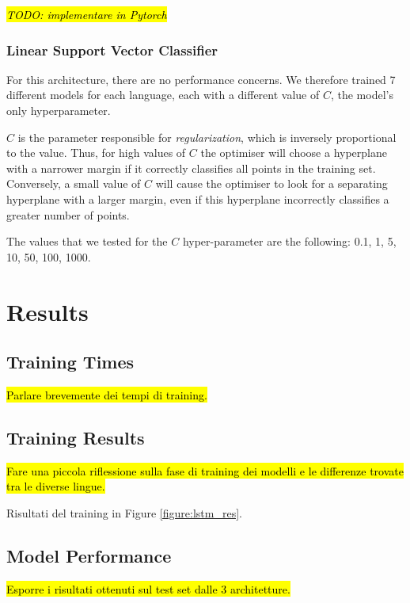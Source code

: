 \documentclass[letterpaper,11pt]{article}
\begin{document}
\hl{\textit{TODO: implementare in Pytorch}}

\subsubsection*{Linear Support Vector Classifier}

For this architecture, there are no performance concerns. We therefore trained 7 different models for each language, each with a different value of $C$, the model's only hyperparameter.

$C$ is the parameter responsible for \textit{regularization}, which is inversely proportional to the value. Thus, for high values of $C$ the optimiser will choose a hyperplane with a narrower margin if it correctly classifies all points in the training set. Conversely, a small value of $C$ will cause the optimiser to look for a separating hyperplane with a larger margin, even if this hyperplane incorrectly classifies a greater number of points. 

The values that we tested for the $C$ hyper-parameter are the following: 0.1, 1, 5, 10, 50, 100, 1000.



\section{Results}
\label{sec:results}

\subsection{Training Times}

\hl{Parlare brevemente dei tempi di training.}

\subsection{Training Results}

\hl{Fare una piccola riflessione sulla fase di training dei modelli e le differenze trovate tra le diverse lingue.}

Risultati del training in Figure \ref{figure:lstm_res}.

\subsection{Model Performance}

\hl{Esporre i risultati ottenuti sul test set dalle 3 architetture.}
\end{document}
